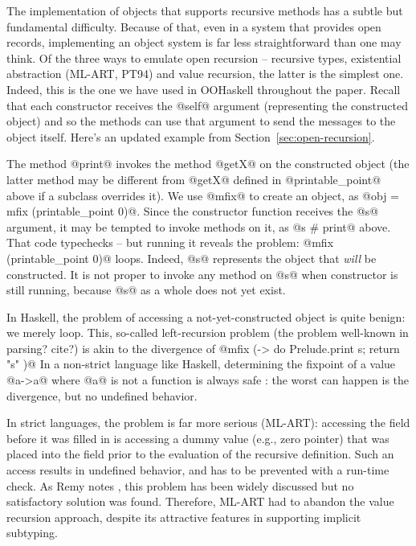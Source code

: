 \documentclass{jfp}
\begin{document}
The implementation of objects that supports recursive methods has a
subtle but fundamental difficulty. Because of that, even in a system
that provides open records, implementing an object system is far less
straightforward than one may think. Of the three ways to emulate open
recursion -- recursive types, existential abstraction (ML-ART, PT94) and
value recursion, the latter is the simplest one. Indeed, this is the
one we have used in OOHaskell throughout the paper. Recall that each
constructor receives the @self@ argument (representing the constructed
object) and so the methods can use that argument to send the messages
to the object itself. Here's an updated example from
Section~\ref{sec:open-recursion}.


The method @print@ invokes the method @getX@ on the constructed object
(the latter method may be different from @getX@ defined in
@printable_point@ above if a subclass overrides it). We use
@mfix@ to create an object, as @obj = mfix (printable_point 0)@. Since
the constructor function receives the @s@ argument, it may be tempted
to invoke methods on it, as @s # print@ above. That code typechecks -- but
running it reveals the problem: @mfix (printable_point 0)@ loops. 
Indeed, @s@ represents the object that \emph{will} be constructed. It
is not proper to invoke any method on @s@ when constructor is still
running, because @s@ as a whole does not yet exist.

In Haskell, the problem of accessing a not-yet-constructed object is
quite benign: we merely loop. This, so-called left-recursion problem
(the problem well-known in parsing? cite?) is akin to the divergence
of @mfix (\s -> do { Prelude.print s; return "s" })@ In a non-strict
language like Haskell, determining the fixpoint of a value @a->a@
where @a@ is not a function is always safe \cite{ML-ART}: the worst
can happen is the divergence, but no undefined behavior.

In strict languages, the problem is far more serious (ML-ART):
accessing the field before it was filled in is accessing a dummy value
(e.g., zero pointer) that was placed into the field prior to the
evaluation of the recursive definition. Such an access results in
undefined behavior, and has to be prevented with a run-time check.
As Remy notes \cite{ML-ART}, this problem has been widely discussed
but no satisfactory solution was found. Therefore, ML-ART had to
abandon the value recursion approach, despite its attractive features
in supporting implicit subtyping.
\end{document}
